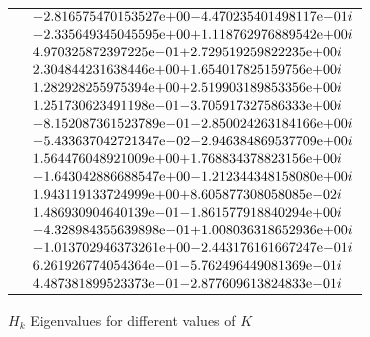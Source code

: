 \begin{figure}[!tbh]
\begin{tabular}{ |p{1cm}|| p{10cm}|}
  &	${-2.816575470153527}\mathrm{e}{+00}   {- 4.470235401498117}\mathrm{e}{-01i}$ \\         
  &	${-2.335649345045595}\mathrm{e}{+00}   {+ 1.118762976889542}\mathrm{e}{+00i}$ \\       
  &	${ 4.970325872397225}\mathrm{e}{-01}   {+ 2.729519259822235}\mathrm{e}{+00i}$ \\       
  &	${ 2.304844231638446}\mathrm{e}{+00}   {+ 1.654017825159756}\mathrm{e}{+00i}$ \\       
  &	${ 1.282928255975394}\mathrm{e}{+00}   {+ 2.519903189853356}\mathrm{e}{+00i}$ \\       
  &	${ 1.251730623491198}\mathrm{e}{-01}   {- 3.705917327586333}\mathrm{e}{+00i}$ \\       
  &	${-8.152087361523789}\mathrm{e}{-01}   {- 2.850024263184166}\mathrm{e}{+00i}$ \\       
  &	${-5.433637042721347}\mathrm{e}{-02}   {- 2.946384869537709}\mathrm{e}{+00i}$ \\       
  &	${ 1.564476048921009}\mathrm{e}{+00}   {+ 1.768834378823156}\mathrm{e}{+00i}$ \\       
  &	${-1.643042886688547}\mathrm{e}{+00}   {- 1.212344348158080}\mathrm{e}{+00i}$ \\       
  &	${ 1.943119133724999}\mathrm{e}{+00}   {+ 8.605877308058085}\mathrm{e}{-02i}$ \\       
  &	${ 1.486930904640139}\mathrm{e}{-01}   {- 1.861577918840294}\mathrm{e}{+00i}$ \\       
  &	${-4.328984355639898}\mathrm{e}{-01}   {+ 1.008036318652936}\mathrm{e}{+00i}$ \\       
  &	${-1.013702946373261}\mathrm{e}{+00}   {- 2.443176161667247}\mathrm{e}{-01i}$ \\       
  &	${ 6.261926774054364}\mathrm{e}{-01}   {- 5.762496449081369}\mathrm{e}{-01i}$ \\       
  &	${ 4.487381899523373}\mathrm{e}{-01}   {- 2.877609613824833}\mathrm{e}{-01i}$ \\         
\hline  
\end{tabular} 
\caption{$H_{k}$ Eigenvalues for different values of $K$}
   \label{tab:h_k_eig}
\end{figure} 


